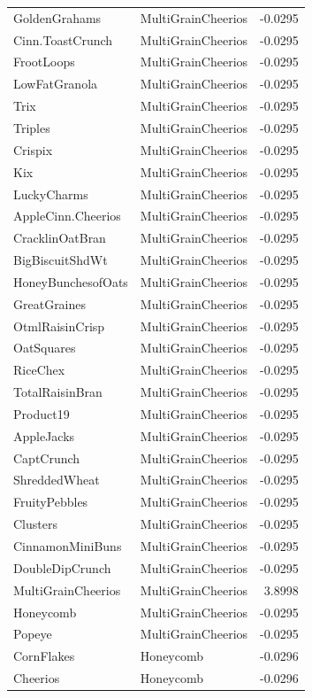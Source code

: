 \begin{longtable}{llr}
GoldenGrahams & MultiGrainCheerios & -0.0295 \\
Cinn.ToastCrunch & MultiGrainCheerios & -0.0295 \\
FrootLoops & MultiGrainCheerios & -0.0295 \\
LowFatGranola & MultiGrainCheerios & -0.0295 \\
Trix & MultiGrainCheerios & -0.0295 \\
Triples & MultiGrainCheerios & -0.0295 \\
Crispix & MultiGrainCheerios & -0.0295 \\
Kix & MultiGrainCheerios & -0.0295 \\
LuckyCharms & MultiGrainCheerios & -0.0295 \\
AppleCinn.Cheerios & MultiGrainCheerios & -0.0295 \\
CracklinOatBran & MultiGrainCheerios & -0.0295 \\
BigBiscuitShdWt & MultiGrainCheerios & -0.0295 \\
HoneyBunchesofOats & MultiGrainCheerios & -0.0295 \\
GreatGraines & MultiGrainCheerios & -0.0295 \\
OtmlRaisinCrisp & MultiGrainCheerios & -0.0295 \\
OatSquares & MultiGrainCheerios & -0.0295 \\
RiceChex & MultiGrainCheerios & -0.0295 \\
TotalRaisinBran & MultiGrainCheerios & -0.0295 \\
Product19 & MultiGrainCheerios & -0.0295 \\
AppleJacks & MultiGrainCheerios & -0.0295 \\
CaptCrunch & MultiGrainCheerios & -0.0295 \\
ShreddedWheat & MultiGrainCheerios & -0.0295 \\
FruityPebbles & MultiGrainCheerios & -0.0295 \\
Clusters & MultiGrainCheerios & -0.0295 \\
CinnamonMiniBuns & MultiGrainCheerios & -0.0295 \\
DoubleDipCrunch & MultiGrainCheerios & -0.0295 \\
MultiGrainCheerios & MultiGrainCheerios & 3.8998 \\
Honeycomb & MultiGrainCheerios & -0.0295 \\
Popeye & MultiGrainCheerios & -0.0295 \\
CornFlakes & Honeycomb & -0.0296 \\
Cheerios & Honeycomb & -0.0296 \\

\end{longtable}
